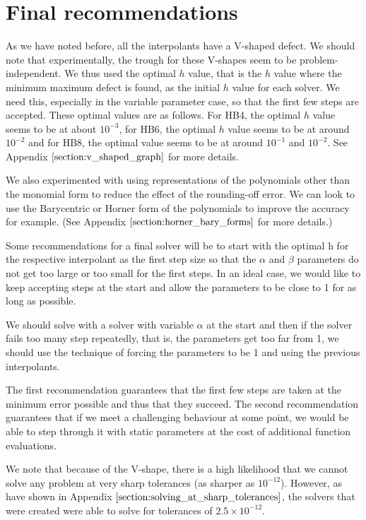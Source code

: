 \section{Final recommendations}
\label{section:defect_final_recommendations}
As we have noted before, all the interpolants have a V-shaped defect. We should note that experimentally, the trough for these V-shapes seem to be problem-independent. We thus used the optimal $h$ value, that is the $h$ value where the minimum maximum defect is found, as the initial $h$ value for each solver. We need this, especially in the variable parameter case, so that the first few steps are accepted. These optimal values are as follows. For HB4, the optimal $h$ value seems to be at about $10^{-3}$, for HB6, the optimal $h$ value seems to be at around $10^{-2}$ and for HB8, the optimal value seems to be at around $10^{-1}$ and $10^{-2}$. See Appendix $\ref{section:v_shaped_graph}$ for more details.

We also experimented with using representations of the polynomials other than the monomial form to reduce the effect of the rounding-off error. We can look to use the Barycentric or Horner form of the polynomials to improve the accuracy for example. (See Appendix $\ref{section:horner_bary_forms}$ for more details.)

Some recommendations for a final solver will be to start with the optimal h for the respective interpolant as the first step size so that the $\alpha$ and $\beta$ parameters do not get too large or too small for the first steps. In an ideal case, we would like to keep accepting steps at the start and allow the parameters to be close to 1 for as long as possible.

We should solve with a solver with variable $\alpha$ at the start and then if the solver fails too many step repeatedly, that is, the parameters get too far from 1, we should use the technique of forcing the parameters to be 1 and using the previous interpolants.

The first recommendation guarantees that the first few steps are taken at the minimum error possible and thus that they succeed. The second recommendation guarantees that if we meet a challenging behaviour at some point, we would be able to step through it with static parameters at the cost of additional function evaluations.

We note that because of the V-shape, there is a high likelihood that we cannot solve any problem at very sharp tolerances (as sharper as $10^{-12}$). However, as have shown in Appendix $\ref{section:solving_at_sharp_tolerances}$, the solvers that were created were able to solve for tolerances of $2.5 \times 10^{-12}$.

%

